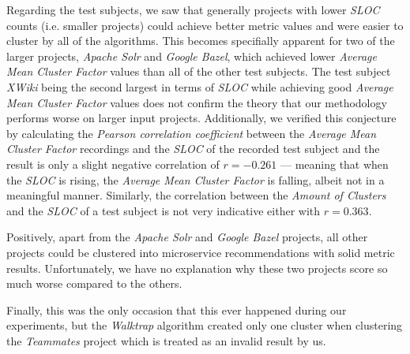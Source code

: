 \documentclass[12pt,a4paper]{report}
\begin{document}
Regarding the test subjects, we saw that generally projects with lower \textit{SLOC} counts
(i.e. smaller projects) could achieve better metric values and were easier to cluster
by all of the algorithms. This becomes specifially apparent for two of the larger
projects, \textit{Apache Solr} and \textit{Google Bazel}, which achieved lower
\textit{Average Mean Cluster Factor} values than all of the other test subjects.
The test subject \textit{XWiki} being the second largest in terms of \textit{SLOC} while
achieving good \textit{Average Mean Cluster Factor} values does not confirm the
theory that our methodology performs worse on larger input projects.
Additionally, we verified this conjecture by calculating the
\textit{Pearson correlation coefficient} \cite{everitt2002cambridge}
between the \textit{Average Mean Cluster Factor}
recordings and the \textit{SLOC} of the recorded test subject and the result is only
a slight negative correlation of \(r = -0.261\) --- meaning that when the \textit{SLOC} is
rising, the \textit{Average Mean Cluster Factor} is falling, albeit not in a meaningful manner.
Similarly, the correlation between the \textit{Amount of Clusters} and the \textit{SLOC}
of a test subject is not very indicative either with \(r = 0.363\).

Positively, apart from the \textit{Apache Solr} and \textit{Google Bazel} projects,
all other projects could be clustered into microservice recommendations with
solid metric results. Unfortunately, we have no explanation why these two projects
score so much worse compared to the others.

Finally, this was the only occasion that this ever happened during our experiments,
but the \textit{Walktrap} algorithm created only one cluster when clustering the
\textit{Teammates} project which is treated as an invalid result by us.
\end{document}
